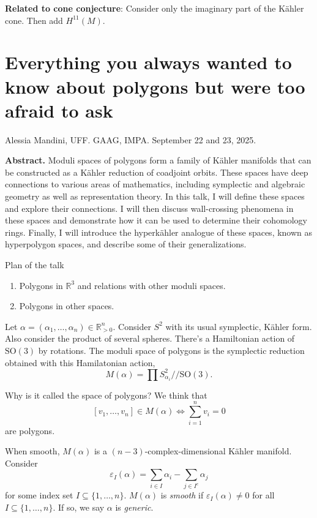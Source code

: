 {\bf Related to cone conjecture}: Consider
only the imaginary part of the Kähler cone.
Then add $H^{11}(M)$.


\section{Everything you always wanted to know
about polygons but were too
afraid to ask}
\label{section-every-you-awlwa-wante-know}

\noindent
Alessia Mandini, UFF.
GAAG, IMPA.
September 22 and 23, 2025.

\medskip\noindent
{\bf Abstract.} Moduli spaces of polygons
form a family of Kähler
manifolds that can be constructed as a Kähler
reduction of coadjoint orbits.
These spaces have deep connections to various
areas of mathematics, including
symplectic and algebraic geometry as well as
representation theory. In this
talk, I will define these spaces and explore
their connections. I will then
discuss wall-crossing phenomena in these
spaces and demonstrate how it can be
used to determine their cohomology rings.
Finally, I will introduce the
hyperkähler analogue of these spaces, known
as hyperpolygon spaces, and describe
some of their generalizations.

\medskip\noindent



Plan of the talk
\begin{enumerate}
\item Polygons in $\mathbb{R}^3$ and
relations with
other moduli spaces.
\item Polygons in other spaces.
\end{enumerate}

Let $\alpha=(\alpha_1,\ldots,\alpha_n)\in
\mathbb{R}^n_{>0}$.
Consider $S^2$ with its usual symplectic,
Kähler form.
Also consider the product of several spheres.
There's a Hamiltonian action of
$\text{SO}(3)$ by rotations.
The moduli space of polygons is
the symplectic reduction obtained with this
Hamilatonian action,
$$
M(\alpha)=\prod
S^2_{\alpha_i}/\!/\text{SO}(3).
$$

Why is it called the space of polygons?
We think that
$$
[v_1,\ldots,v_n] \in M(\alpha) \iff
\sum_{i=1}^nv_i=0
$$
are polygons.

When smooth, $M(\alpha)$ is a
$(n-3)$-complex-dimensional
Kähler manifold. Consider
$$
\varepsilon_I(\alpha)=\sum_{i \in I}\alpha_i
-\sum_{j \in I^c}\alpha_j
$$
for some index set $I \subseteq \{1,\ldots,
n\}$.
$M(\alpha)$ is {\it smooth} if
$\varepsilon_I(\alpha)
\neq 0$ for all $I\subseteq \{1,\ldots,n\}$.
If so, we say $\alpha$ is {\it generic}.

